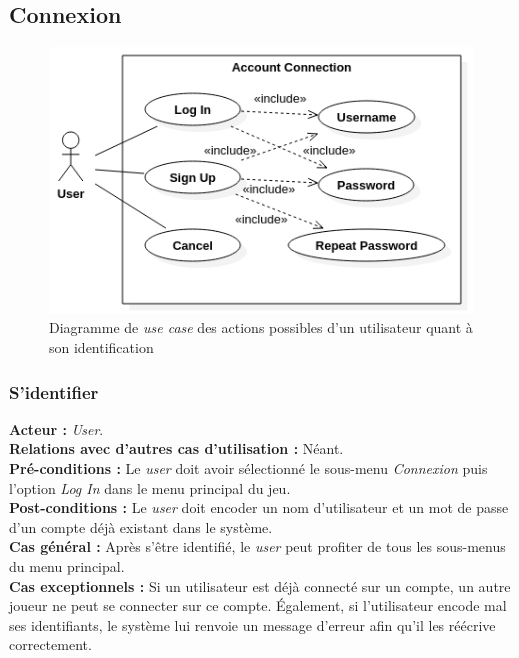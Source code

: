 \documentclass[10pt, a4paper]{article}
\begin{document}
\subsection{Connexion}

\begin{figure}[H]
\centering
\includegraphics[scale=0.5]{ConnectionUseCase.png}
\caption{Diagramme de \textit{use case} des actions possibles d'un utilisateur quant à son identification}
\label{UC_co} %
\end{figure}

\subsubsection{S'identifier}
\textbf{Acteur :} \textit{User}.\\
\textbf{Relations avec d'autres cas d'utilisation :} Néant.\\
\textbf{Pré-conditions :} Le \textit{user} doit avoir sélectionné le sous-menu \textit{Connexion} puis l'option {\itshape Log In} dans le menu principal du jeu.\\
\textbf{Post-conditions :} Le \textit{user} doit encoder un nom d'utilisateur et un mot de passe d'un compte déjà existant dans le système. \\
\textbf{Cas général :} Après s'être identifié, le \textit{user} peut profiter de tous les sous-menus du menu principal.\\
\textbf{Cas exceptionnels :} Si un utilisateur est déjà connecté sur un compte, un autre joueur ne peut se connecter sur ce compte. Également, si l'utilisateur encode mal ses identifiants, le système lui renvoie un message d'erreur afin qu'il les réécrive correctement.
\end{document}
